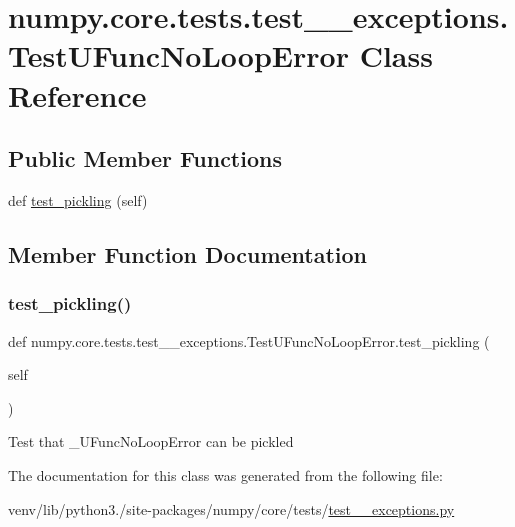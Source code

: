 \hypertarget{classnumpy_1_1core_1_1tests_1_1test____exceptions_1_1TestUFuncNoLoopError}{}\section{numpy.\+core.\+tests.\+test\+\_\+\+\_\+exceptions.\+Test\+U\+Func\+No\+Loop\+Error Class Reference}
\label{classnumpy_1_1core_1_1tests_1_1test____exceptions_1_1TestUFuncNoLoopError}
\subsection*{Public Member Functions}
\begin{DoxyCompactItemize}
\item 
def \hyperlink{classnumpy_1_1core_1_1tests_1_1test____exceptions_1_1TestUFuncNoLoopError_a28e6a240be092fdb91da12d02869fec8}{test\+\_\+pickling} (self)
\end{DoxyCompactItemize}


\subsection{Member Function Documentation}
\mbox{\label{classnumpy_1_1core_1_1tests_1_1test____exceptions_1_1TestUFuncNoLoopError_a28e6a240be092fdb91da12d02869fec8}} 
\subsubsection{\texorpdfstring{test\+\_\+pickling()}{test\_pickling()}}
{\footnotesize\ttfamily def numpy.\+core.\+tests.\+test\+\_\+\+\_\+exceptions.\+Test\+U\+Func\+No\+Loop\+Error.\+test\+\_\+pickling (\begin{DoxyParamCaption}\item[{}]{self }\end{DoxyParamCaption})}

\begin{DoxyVerb}Test that _UFuncNoLoopError can be pickled \end{DoxyVerb}
 

The documentation for this class was generated from the following file\+:\begin{DoxyCompactItemize}
\item 
venv/lib/python3./site-\/packages/numpy/core/tests/\hyperlink{test____exceptions_8py}{test\+\_\+\+\_\+exceptions.\+py}\end{DoxyCompactItemize}
